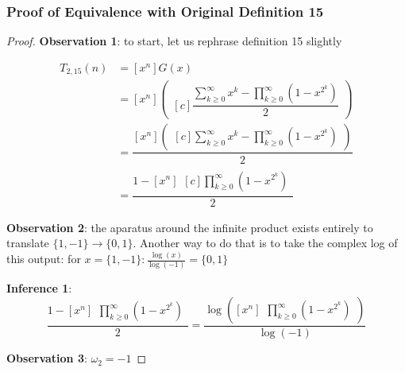 \documentclass[conference]{IEEEtran}
\begin{document}
\subsubsection{Proof of Equivalence with Original Definition 15}

\begin{proof}
\textbf{Observation 1}: to start, let us rephrase definition 15 slightly

\begin{equation}
\begin{aligned}
T_{2,15}(n) &= [x^n]G(x) \\
    &= [x^n] \left(\begin{aligned}[c]
    \dfrac{\displaystyle\sum_{k\ge0}^\infty x^k - \prod_{k \ge 0}^\infty (1 - x^{2^k})}{2}
    \end{aligned}\right) \\
    &= \dfrac{[x^n] \left(\begin{aligned}[c]
    \displaystyle\sum_{k\ge0}^\infty x^k - \prod_{k \ge 0}^\infty (1 - x^{2^k})\end{aligned}\right)}{2}
     \\
    &= \dfrac{1 - [x^n]\begin{aligned}[c]
    \displaystyle\prod_{k \ge 0}^\infty (1 - x^{2^k})
    \end{aligned}
    }{2}
\end{aligned}
\end{equation}

\textbf{Observation 2}: the aparatus around the infinite product exists entirely to translate $\{1, -1\} \to \{0, 1\}$. Another way to do that is to take the complex log of this output: for $x = \{1, -1\}: \tfrac{\log(x)}{\log(-1)} = \{0, 1\}$

\textbf{Inference 1}: \begin{equation}
    \dfrac{1 - [x^n]\begin{aligned}
    \displaystyle\prod_{k \ge 0}^\infty (1 - x^{2^k})
    \end{aligned}
    }{2} = \dfrac{\log\left([x^n]\begin{aligned}
    \displaystyle\prod_{k \ge 0}^\infty (1 - x^{2^k})
    \end{aligned}\right)}{\log(-1)}
\end{equation}

\textbf{Observation 3}: $\omega_2 = -1$


\end{proof}
\end{document}
